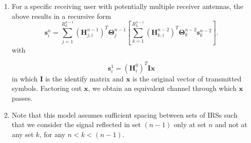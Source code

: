 \documentclass[12pt,a4paper]{report}
\begin{document}
\begin{enumerate}
\item For a specific receiving user with potentially multiple receiver antennas, the above results in a recursive form
\begin{equation}
\mathbf{s}^{n}_{i} = \sum_{j = 1}^{R^{n-1}_L} (\mathbf{H}^{n-1}_{j,i})^T\boldsymbol{\Theta}^{n-1}_{j} \left[
\sum_{k = 1}^{R^{n-1}_L} (\mathbf{H}^{n-2}_{k,i})^T\boldsymbol{\Theta}^{n-2}_{k}\mathbf{s}^{n-2}_{k} \right].
\end{equation}
with 

\begin{equation}
\mathbf{s}^{1}_{i} = (\mathbf{H}^{0}_{i})^T\boldsymbol{I}\mathbf{x}
\end{equation}
 in which $\boldsymbol{I}$ is the identify matrix and $\mathbf{x}$ is the original vector of transmitted symbols.
 Factoring out $\mathbf{x}$, we obtain an equivalent channel through which $\mathbf{x}$ passes.
  
\item
	Note that this model assumes sufficient spacing between sets of IRSs such that we consider the signal reflected in set $(n-1)$ only at set $n$ and not at any set $k$, for any $n<k<(n-1)$.
\end{enumerate}
\end{document}
